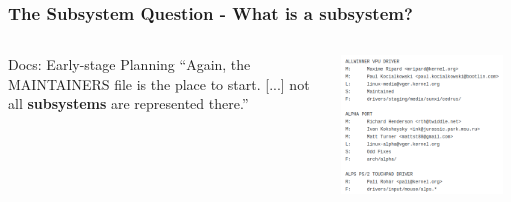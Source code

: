 \documentclass[9pt]{beamer}
\begin{document}
	\begin{frame}
	\frametitle{The Subsystem Question - What is a subsystem?}


	\begin{columns}
		\begin{column}{0.55\textwidth}
			\begin{block}{Docs: Early-stage Planning}
				``Again, the MAINTAINERS file is	the place to start. [...] not all \textbf{subsystems} are represented there.''
			\end{block}
		\end{column}
		\begin{column}{0.5\textwidth}
			\begin{center}
     		\includegraphics[width=0.95\textwidth]{pics/MAINTAINERSbild.png}
			\end{center}
		\end{column}
	\end{columns}
	\end{frame}
\end{document}
